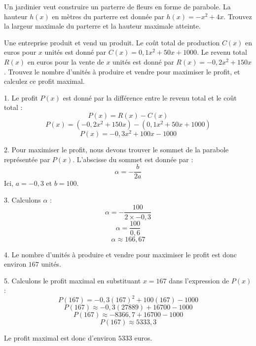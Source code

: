 \documentclass[11pt,a4paper]{article}  %
\begin{document}
\exercice{}

Un jardinier veut construire un parterre de fleurs en forme de parabole. La hauteur \( h(x) \) en mètres du parterre est donnée par \( h(x) = -x^2 + 4x \). Trouvez la largeur maximale du parterre et la hauteur maximale atteinte.


Une entreprise produit et vend un produit. Le coût total de production \( C(x) \) en euros pour \( x \) unités est donné par \( C(x) = 0,1x^2 + 50x + 1000 \). Le revenu total \( R(x) \) en euros pour la vente de \( x \) unités est donné par \( R(x) = -0,2x^2 + 150x \). Trouvez le nombre d'unités à produire et vendre pour maximiser le profit, et calculez ce profit maximal.

\begin{corrBox}
	1. Le profit \( P(x) \) est donné par la différence entre le revenu total et le coût total :
	\[ P(x) = R(x) - C(x) \]
	\[ P(x) = (-0,2x^2 + 150x) - (0,1x^2 + 50x + 1000) \]
	\[ P(x) = -0,3x^2 + 100x - 1000 \]
	
	2. Pour maximiser le profit, nous devons trouver le sommet de la parabole représentée par \( P(x) \). L'abscisse du sommet est donnée par :
	\[ \alpha = -\frac{b}{2a} \]
	Ici, \( a = -0,3 \) et \( b = 100 \).
	
	3. Calculons \( \alpha \) :
	\[ \alpha = -\frac{100}{2 \times -0,3} \]
	\[ \alpha = \frac{100}{0,6} \]
	\[ \alpha \approx 166,67 \]
	
	4. Le nombre d'unités à produire et vendre pour maximiser le profit est donc environ $167$ unités.
	
	5. Calculons le profit maximal en substituant \( x = 167 \) dans l'expression de \( P(x) \) :
	\[ P(167) = -0,3(167)^2 + 100(167) - 1000 \]
	\[ P(167) \approx -0,3(27889) + 16700 - 1000 \]
	\[ P(167) \approx -8366,7 + 16700 - 1000 \]
	\[ P(167) \approx 5333,3 \]
	
	Le profit maximal est donc d'environ $5333$ euros.
\end{corrBox}
\end{document}
